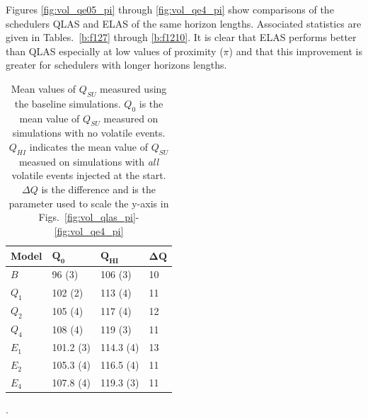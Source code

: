 Figures \ref{fig:vol_qe05_pi} through \ref{fig:vol_qe4_pi} show comparisons of the schedulers QLAS and ELAS of the same horizon lengths. Associated statistics are given in Tables.~\ref{b:f127} through \ref{b:f1210}. It is clear that ELAS performs better than QLAS especially at low values of proximity ($\pi$) and that this improvement is greater for schedulers with longer horizons lengths.


\begin{table}[htbp]
\begin{center}
\begin{tabular}{|l|l|l|l|}
\hline
\bf{Model} &  $\mathbf{Q_0}$  & $\mathbf{Q_{HI}}$  & $\mathbf{\Delta Q}$ \\
\hline
$B$        & 96 (3)       &  106 (3)      &   10 \\
\hline
$Q_1$      & 102 (2)      &  113 (4)     &   11\\
\hline
$Q_2$      & 105 (4)      &  117 (4)     &  12\\
\hline
$Q_4$      & 108 (4)      &  119 (3)     &  11\\
\hline\hline
$E_1$      & 101.2 (3)    &  114.3 (4)     & 13 \\
\hline
$E_2$      & 105.3 (4)    &  116.5 (4)     &  11\\
\hline
$E_4$      & 107.8 (4)    &  119.3 (3)     &  11\\
\hline
\end{tabular}
\end{center}
\caption[Mean values of $Q_{SU}$ measured using baseline simulations.]
{Mean values of $Q_{SU}$ measured using the baseline simulations. $Q_0$ is the mean value of $Q_{SU}$ measured on simulations with no volatile events. $Q_{HI}$ indicates the  mean value of $Q_{SU}$ measued on simulations with \emph{all} volatile events injected at the start. $\Delta Q$ is the difference and is the parameter used to scale the y-axis in Figs.~\ref{fig:vol_qlas_pi}-\ref{fig:vol_qe4_pi}}.
\label{tab:vollohi}
\end{table}


